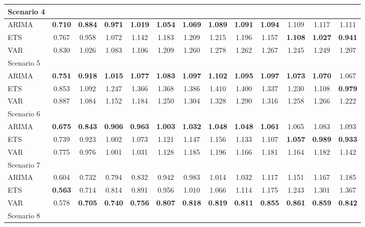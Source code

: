 \begin{table}[H]
{\begin{tabular}{lcccccccccccc}
\hline
Scenario 4 &  &  &  &  &  &  &  &  &  &  &  & \\
\hline
ARIMA & \textbf{0.710} & \textbf{0.884} & \textbf{0.971} & \textbf{1.019} & \textbf{1.054} & \textbf{1.069} & \textbf{1.089} & \textbf{1.091} & \textbf{1.094} & 1.109 & 1.117 & 1.111\\
ETS & 0.767 & 0.958 & 1.072 & 1.142 & 1.183 & 1.209 & 1.215 & 1.196 & 1.157 & \textbf{1.108} & \textbf{1.027} & \textbf{0.941}\\
VAR & 0.830 & 1.026 & 1.083 & 1.106 & 1.209 & 1.260 & 1.278 & 1.262 & 1.267 & 1.245 & 1.249 & 1.207\\
\hline
Scenario 5 &  &  &  &  &  &  &  &  &  &  &  & \\
\hline
ARIMA & \textbf{0.751} & \textbf{0.918} & \textbf{1.015} & \textbf{1.077} & \textbf{1.083} & \textbf{1.097} & \textbf{1.102} & \textbf{1.095} & \textbf{1.097} & \textbf{1.073} & \textbf{1.070} & 1.067\\
ETS & 0.853 & 1.092 & 1.247 & 1.366 & 1.368 & 1.386 & 1.410 & 1.400 & 1.337 & 1.230 & 1.108 & \textbf{0.979}\\
VAR & 0.887 & 1.084 & 1.152 & 1.184 & 1.250 & 1.304 & 1.328 & 1.290 & 1.316 & 1.258 & 1.266 & 1.222\\
\hline
Scenario 6 &  &  &  &  &  &  &  &  &  &  &  & \\
\hline
ARIMA & \textbf{0.675} & \textbf{0.843} & \textbf{0.906} & \textbf{0.963} & \textbf{1.003} & \textbf{1.032} & \textbf{1.048} & \textbf{1.048} & \textbf{1.061} & 1.065 & 1.083 & 1.093\\
ETS & 0.739 & 0.923 & 1.002 & 1.073 & 1.121 & 1.147 & 1.156 & 1.133 & 1.107 & \textbf{1.057} & \textbf{0.989} & \textbf{0.933}\\
VAR & 0.775 & 0.976 & 1.001 & 1.031 & 1.128 & 1.185 & 1.196 & 1.166 & 1.181 & 1.164 & 1.182 & 1.142\\
\hline
Scenario 7 &  &  &  &  &  &  &  &  &  &  &  & \\
\hline
ARIMA & 0.604 & 0.732 & 0.794 & 0.832 & 0.942 & 0.983 & 1.014 & 1.032 & 1.117 & 1.151 & 1.167 & 1.185\\
ETS & \textbf{0.563} & 0.714 & 0.814 & 0.891 & 0.956 & 1.010 & 1.066 & 1.114 & 1.175 & 1.243 & 1.301 & 1.367\\
VAR & 0.578 & \textbf{0.705} & \textbf{0.740} & \textbf{0.756} & \textbf{0.807} & \textbf{0.818} & \textbf{0.819} & \textbf{0.811} & \textbf{0.855} & \textbf{0.861} & \textbf{0.859} & \textbf{0.842}\\
\hline
Scenario 8 &  &  &  &  &  &  &  &  &  &  &  & \\

\end{tabular}}
\end{table}
